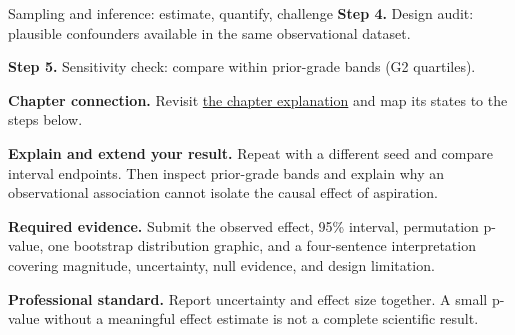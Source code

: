 \begin{labproject}{Sampling and inference: estimate, quantify, challenge}
\noindent\textbf{Step 4.} Design audit: plausible confounders available in the same observational dataset.


\noindent\textbf{Step 5.} Sensitivity check: compare within prior-grade bands (G2 quartiles).

\textbf{Chapter connection.} Revisit \hyperref[ch:inference]{the chapter explanation} and map its states to the steps below.


\begin{verification}
\textbf{Explain and extend your result.} Repeat with a different seed and compare interval endpoints. Then inspect prior-grade bands and explain why an observational association cannot isolate the causal effect of aspiration.


\textbf{Required evidence.} Submit the observed effect, 95\% interval, permutation p-value, one bootstrap distribution graphic, and a four-sentence interpretation covering magnitude, uncertainty, null evidence, and design limitation.

\textbf{Professional standard.} Report uncertainty and effect size together. A small p-value without a meaningful effect estimate is not a complete scientific result.
\end{verification}
\end{labproject}
